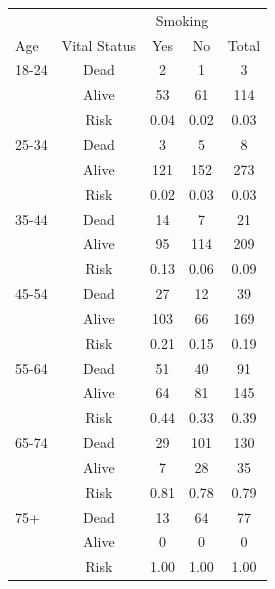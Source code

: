 \documentclass[landscape,twocolumn,letterpaper,9pt,reqno]{article}\usepackage[]{graphicx}\usepackage[]{color}
\begin{document}
\begin{table}[h]
	\centering
	\begin{tabular}{lcccc}
		 &  &   \multicolumn{2}{c}{Smoking} &  \\		
		Age & Vital Status &  Yes & No & Total \\
		18-24 	& Dead 	& 2  	& 1 	& 3 	\\	
		 		& Alive & 53  	& 61 	& 114 	\\
		 		& Risk & 0.04  	& 0.02 	& 0.03 	\\
		 		\hline
		25-34 	& Dead 	& 3  	& 5 	& 8 	\\	
& Alive & 121  	& 152 	& 273 	\\
& Risk & 0.02  	& 0.03 	& 0.03 \\
\hline 			
35-44 	& Dead 	& 14  	& 7 	& 21 	\\	
& Alive & 95  	& 114 	& 209 	\\
& Risk & 0.13  	& 0.06 	& 0.09 \\
\hline
45-54 	& Dead 	& 27  	& 12 	& 39 	\\	
& Alive & 103  	& 66 	& 169 	\\
& Risk & 0.21  	& 0.15 	& 0.19 \\
		 		\hline
55-64 	& Dead 	& 51  	& 40 	& 91 	\\	
& Alive & 64  	& 81 	& 145 	\\
& Risk & 0.44  	& 0.33 	& 0.39 \\
		 		\hline
65-74 	& Dead 	& 29  	& 101 	& 130 	\\	
& Alive & 7  	& 28 	& 35 	\\
& Risk & 0.81  	& 0.78 	& 0.79 \\
		 		\hline
75+ 	& Dead 	& 13  	& 64 	& 77 	\\	
& Alive & 0  	& 0 	& 0 	\\
& Risk & 1.00  	& 1.00 	& 1.00 \\
\hline
	\end{tabular}
\end{table}
\end{document}

